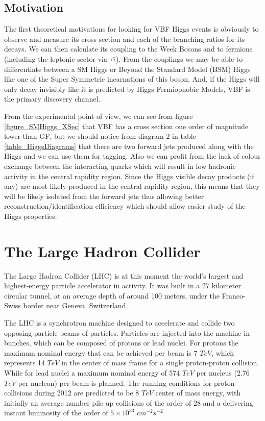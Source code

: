 \documentclass[%
 reprint,
 amsmath,
 amssymb,
 aps,
 pra,
 showkeys
]{revtex4-1}
\begin{document}
\subsection{Motivation}

The first theoretical motivations for looking for VBF Higgs events is obviously to observe and measure its
cross section and each of the branching ratios for its decays. We can then calculate its coupling to the 
Week Bosons and to fermions (including the leptonic sector via $\tau\bar{\tau}$). From the couplings we may be able to
differentiate between a SM Higgs or Beyond the Standard Model (BSM) Higgs like one of the Super Symmetric
incarnations of this boson\cite{article:Duhrssen:2004cv,article:Zeppenfeld:2000td}. And, if the Higgs will only decay invisibly like it is predicted by Higgs Fermiophobic 
Models, VBF is the primary discovery channel.

From the experimental point of view, we can see from figure \ref{figure_SMHiggs_XSec} that VBF has a cross section
one order of magnitude lower than GF, but we should notice from diagram 2 in table \ref{table_HiggsDiagrams} that
there are two forward jets produced along with the Higgs and we can use them for tagging. Also we can profit from
the lack of colour exchange between the interacting quarks which will result in low hadronic activity in the 
central rapidity region. Since the Higgs visible decay products (if any) are most likely produced in the 
central rapidity region, this means that they will be likely isolated from the forward jets thus allowing better 
reconstruction/identification efficiency which should allow easier study of the Higgs properties.

\section{The Large Hadron Collider}

The Large Hadron Collider (LHC) is at this moment the world's largest and highest-energy particle accelerator
in activity. It was built in a 27 kilometer circular tunnel, at an average depth of around 100 meters, under the
Franco-Swiss border near Geneva, Switzerland\cite{Bruning:2004ej}.

The LHC is a synchrotron machine designed to accelerate and collide two opposing particle beams of particles.
Particles are injected into the machine in bunches, which can be composed of protons or lead nuclei. For
protons the maximum nominal energy that can be achieved per beam is 7 $TeV$, which represents 14 $TeV$ in the 
center of mass frame for a single proton-proton collision. While for lead nuclei a maximum nominal energy of 
574 $TeV$ per nucleus (2.76 $TeV$ per nucleon) per beam is planned. The running conditions for proton collisions
during 2012 are predicted to be 8 $TeV$ center of mass energy, with initially an average number pile up collisions
of the order of 28 and a delivering instant luminosity of the order of $5 \times 10^{33}$ $cm^{-2}s^{-2}$
\end{document}
